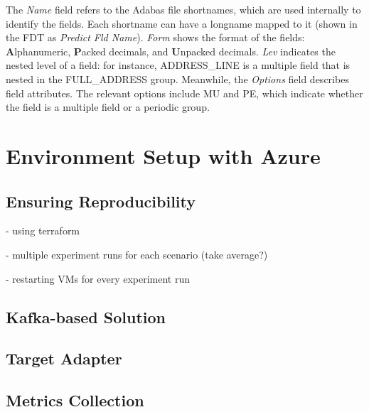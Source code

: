 The \textit{Name} field refers to the Adabas file shortnames, which are used internally to identify the fields. Each shortname can have a longname mapped to it (shown in the \ac{FDT} as \textit{Predict Fld Name}). \textit{Form} shows the format of the fields: \textbf{A}lphanumeric, \textbf{P}acked decimals, and \textbf{U}npacked decimals. \textit{Lev} indicates the nested level of a field: for instance, ADDRESS\_LINE is a multiple field that is nested in the FULL\_ADDRESS group. Meanwhile, the \textit{Options} field describes field attributes. The relevant options include MU and PE, which indicate whether the field is a multiple field or a periodic group.

\section{Environment Setup with Azure}
\label{ch05:methodology:environmentsetup}

\subsection{Ensuring Reproducibility}
- using terraform

- multiple experiment runs for each scenario (take average?)

- restarting VMs for every experiment run


\subsection{Kafka-based Solution}

\subsection{Target Adapter}

\subsection{Metrics Collection}